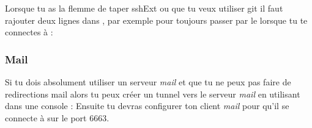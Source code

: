 Lorsque tu as la flemme de taper sshExt ou que tu veux utiliser git il faut rajouter deux lignes dans , par exemple pour toujours passer par le  lorsque tu te connectes à  :

\subsubsection{Mail}

Si tu dois absolument utiliser un serveur \emph{mail} et que tu ne peux pas faire de redirections mail alors tu peux créer un tunnel vers le serveur \emph{mail} en utilisant dans une console :
Ensuite tu devras configurer ton client \emph{mail} pour qu'il se connecte à  sur le port 6663.
